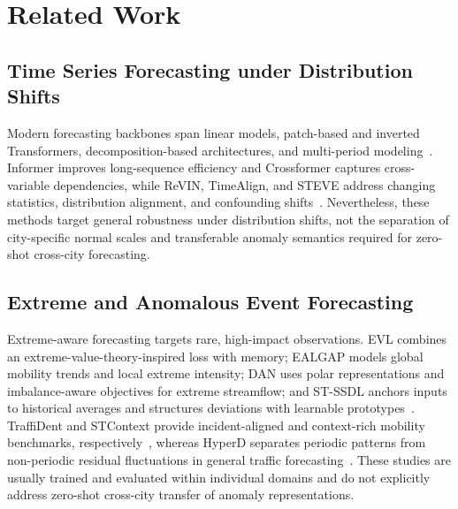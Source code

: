 \section{Related Work}

\subsection{Time Series Forecasting under Distribution Shifts}
Modern forecasting backbones span linear models, patch-based and inverted Transformers, decomposition-based architectures, and multi-period modeling~\cite{dlinear,PatchTST,iTransformer,autoformer,timesnet}. Informer improves long-sequence efficiency and Crossformer captures cross-variable dependencies, while ReVIN, TimeAlign, and STEVE address changing statistics, distribution alignment, and confounding shifts~\cite{informer,crossformer,revin,timealign,steve}. Nevertheless, these methods target general robustness under distribution shifts, not the separation of city-specific normal scales and transferable anomaly semantics required for zero-shot cross-city forecasting.

\subsection{Extreme and Anomalous Event Forecasting}
Extreme-aware forecasting targets rare, high-impact observations. EVL combines an extreme-value-theory-inspired loss with memory; EALGAP models global mobility trends and local extreme intensity; DAN uses polar representations and imbalance-aware objectives for extreme streamflow; and ST-SSDL anchors inputs to historical averages and structures deviations with learnable prototypes~\cite{evl,ealgap,dan,stssdl}. TraffiDent and STContext provide incident-aligned and context-rich mobility benchmarks, respectively~\cite{traffident,stcontext}, whereas HyperD separates periodic patterns from non-periodic residual fluctuations in general traffic forecasting~\cite{hyperd}. These studies are usually trained and evaluated within individual domains and do not explicitly address zero-shot cross-city transfer of anomaly representations.

